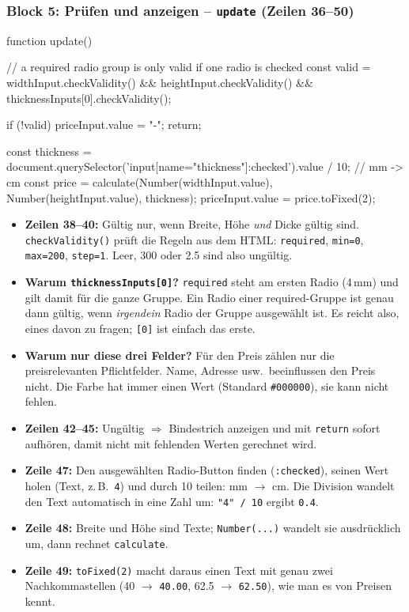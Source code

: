 \documentclass[a4paper,11pt]{article}
\begin{document}
\subsubsection*{Block 5: Prüfen und anzeigen -- \texttt{update} (Zeilen 36--50)}
\begin{code}[firstnumber=36]
function update() {
    // a required radio group is only valid if one radio is checked
    const valid = widthInput.checkValidity() &&
        heightInput.checkValidity() &&
        thicknessInputs[0].checkValidity();

    if (!valid) {
        priceInput.value = "-";
        return;
    }

    const thickness = document.querySelector('input[name="thickness"]:checked').value / 10; // mm -> cm
    const price = calculate(Number(widthInput.value), Number(heightInput.value), thickness);
    priceInput.value = price.toFixed(2);
}
\end{code}
\begin{itemize}
\item \textbf{Zeilen 38--40:} Gültig nur, wenn Breite, Höhe \emph{und} Dicke gültig sind. \texttt{checkValidity()}
      prüft die Regeln aus dem HTML: \texttt{required}, \texttt{min=\textquotedbl{}0\textquotedbl{}}, \texttt{max=\textquotedbl{}200\textquotedbl{}}, \texttt{step=\textquotedbl{}1\textquotedbl{}}.
      Leer, 300 oder 2.5 sind also ungültig.
\item \textbf{Warum \texttt{thicknessInputs[0]}?} \texttt{required} steht am ersten Radio (4\,mm) und gilt damit für die
      ganze Gruppe. Ein Radio einer required-Gruppe ist genau dann gültig, wenn \emph{irgendein} Radio der Gruppe
      ausgewählt ist. Es reicht also, eines davon zu fragen; \texttt{[0]} ist einfach das erste.
\item \textbf{Warum nur diese drei Felder?} Für den Preis zählen nur die preisrelevanten Pflichtfelder. Name,
      Adresse usw.\ beeinflussen den Preis nicht. Die Farbe hat immer einen Wert (Standard \texttt{\#000000}),
      sie kann nicht fehlen.
\item \textbf{Zeilen 42--45:} Ungültig $\Rightarrow$ Bindestrich anzeigen und mit \texttt{return} sofort aufhören, damit
      nicht mit fehlenden Werten gerechnet wird.
\item \textbf{Zeile 47:} Den ausgewählten Radio-Button finden (\texttt{:checked}), seinen Wert holen (Text, z.\,B.\
      \texttt{\textquotedbl{}4\textquotedbl{}}) und durch 10 teilen: mm $\to$ cm. Die Division wandelt den Text automatisch in eine Zahl um:
      \lstinline|"4" / 10| ergibt \lstinline|0.4|.
\item \textbf{Zeile 48:} Breite und Höhe sind Texte; \texttt{Number(...)} wandelt sie ausdrücklich um, dann rechnet
      \texttt{calculate}.
\item \textbf{Zeile 49:} \lstinline|toFixed(2)| macht daraus einen Text mit genau zwei Nachkommastellen
      (40 $\to$ \texttt{\textquotedbl{}40.00\textquotedbl{}}, 62.5 $\to$ \texttt{\textquotedbl{}62.50\textquotedbl{}}), wie man es von Preisen kennt.
\end{itemize}
\end{document}
